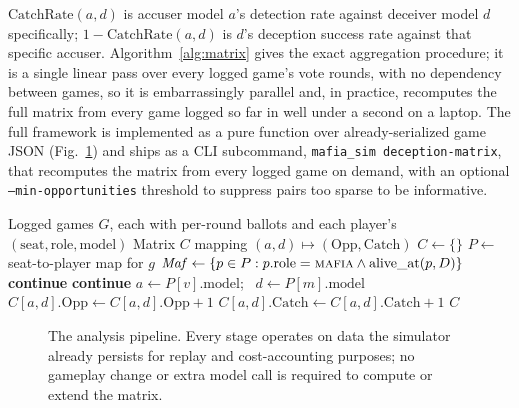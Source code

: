 \documentclass[10pt,conference]{IEEEtran}
\begin{document}
$\mathrm{CatchRate}(a,d)$ is accuser model $a$'s detection rate against deceiver model $d$ specifically; $1-\mathrm{CatchRate}(a,d)$ is $d$'s deception success rate against that specific accuser. Algorithm~\ref{alg:matrix} gives the exact aggregation procedure; it is a single linear pass over every logged game's vote rounds, with no dependency between games, so it is embarrassingly parallel and, in practice, recomputes the full matrix from every game logged so far in well under a second on a laptop. The full framework is implemented as a pure function over already-serialized game JSON (Fig.~\ref{fig:pipeline}) and ships as a CLI subcommand, \texttt{mafia\_sim deception-matrix}, that recomputes the matrix from every logged game on demand, with an optional \texttt{--min-opportunities} threshold to suppress pairs too sparse to be informative.

\begin{algorithm}[t]
\caption{Cross-Vendor Deception-Asymmetry Matrix}
\label{alg:matrix}
\begin{algorithmic}[1]
\Require Logged games $G$, each with per-round ballots and each player's $(\mathrm{seat}, \mathrm{role}, \mathrm{model})$
\Ensure Matrix $C$ mapping $(a,d) \mapsto (\mathrm{Opp}, \mathrm{Catch})$
\State $C \gets \{\}$ 
  \State $P \gets$ seat-to-player map for $g$
    \State $\mathit{Maf} \gets \{p \in P : p.\mathrm{role} = \textsc{mafia} \wedge \mathrm{alive\_at}(p, D)\}$
     \textbf{continue} \EndIf
     
       \textbf{continue} \EndIf
        \State $a \gets P[v].\mathrm{model}$; \, $d \gets P[m].\mathrm{model}$
        \State $C[a,d].\mathrm{Opp} \gets C[a,d].\mathrm{Opp} + 1$
          \State $C[a,d].\mathrm{Catch} \gets C[a,d].\mathrm{Catch} + 1$
        \EndIf
      \EndFor
    \EndFor
  \EndFor
\EndFor
\State \Return $C$
\end{algorithmic}
\end{algorithm}

\begin{figure}[t]
\centering
{}
\caption{The analysis pipeline. Every stage operates on data the simulator already persists for replay and cost-accounting purposes; no gameplay change or extra model call is required to compute or extend the matrix.}
\label{fig:pipeline}
\end{figure}
\end{document}
